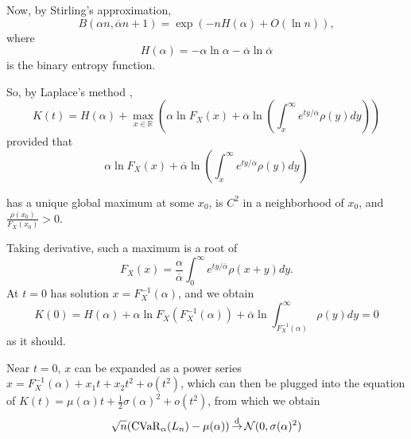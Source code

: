 Now, by Stirling's approximation, 
$$B(\alpha n, \overbar{\alpha} n + 1) = \exp(-n H(\alpha) + O(\ln n)),$$
where 
\begin{equation}
H(\alpha) = -\alpha \ln \alpha - \overbar{\alpha} \ln \overbar{\alpha}
\end{equation} 
is the binary entropy function.

So, by Laplace's method 
\cite[Section 6.4]{benderAdvancedMathematicalMethods1999}, 
\begin{equation}
K(t) = H(\alpha) + \max_{x\in\mathbb{R}}
\left(\alpha \ln F_X(x)
+
\overbar{\alpha}\ln\left(\int_x^\infty  e^{ty/\overbar{\alpha}} \rho(y)dy\right)\right)
\end{equation}
provided that 
\begin{equation}
	\label{eq:maxfun}
\alpha \ln F_X(x)
+
\overbar{\alpha}\ln\left(\int_x^\infty  e^{ty/\overbar{\alpha}} \rho(y)dy\right)
\end{equation}

has a unique global maximum at some $x_0$, is $C^2$ in a neighborhood of $x_0$, and $\frac{\rho(x_0)}{F_X(x_0)}> 0$. 

Taking derivative, such a maximum is a root of 
\begin{equation}
\label{eq:maxfun_root}
F_X(x) = \frac{\alpha}{\overbar{\alpha}}\int_0^\infty e^{ty/\overbar{\alpha}}\rho(x+y)dy.
\end{equation}
At $ t = 0$ has solution $x = F_X^{-1}(\alpha)$, and we obtain
$$K(0) = H(\alpha) + \alpha \ln F_X(F_X^{-1}(\alpha)) + \overbar\alpha\ln\int_{F_X^{-1}(\alpha)}^\infty \rho(y)dy = 0$$
as it should.

Near $t=0$, $x$ can be expanded as a power series $x = F_X^{-1}(\alpha) + x_1 t + x_2 t^2 + o(t^2) $, which can then be plugged into the equation of $K(t) = \mu(\alpha) t + \frac 12 \sigma(\alpha)^2 + o(t^2)$, from which we obtain 
\begin{equation}
\sqrt{n}(\operatorname{CVaR}_\alpha(L_n) - \mu(\alpha))\operatorname*{\stackrel{\text {d}}{\to}} \mathcal{N}(0, \sigma(\alpha)^2)
\end{equation}

